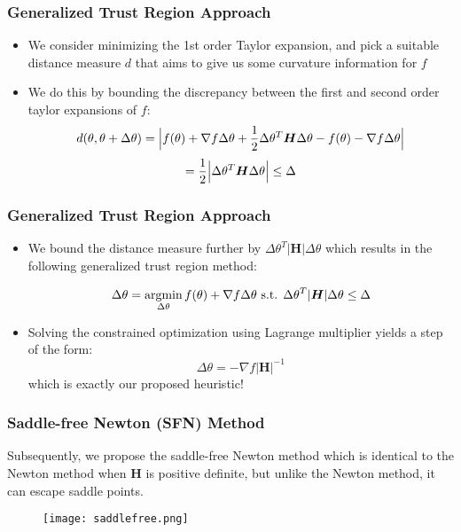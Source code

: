 \documentclass{beamer}
\begin{document}
\begin{frame}
\frametitle{Generalized Trust Region Approach}

\vspace{-0.1in}

\begin{itemize}
\item{We consider minimizing the 1st order Taylor expansion, and pick a suitable distance measure $d$ that aims to give us some curvature information for $f$}
\pause
\vspace{0.1in}

\item{We do this by bounding the discrepancy between the first and second order taylor expansions of $f$: $$ d(\theta, \theta + \Delta \theta) = \Bigl| f(\theta) + \nabla f \Delta\theta + \frac{1}{2}\Delta\theta^{T}\bm{H}\Delta\theta - f(\theta) - \nabla f \Delta\theta \Bigr|$$
$$ = \frac{1}{2} \Bigl | \Delta\theta^T \bm{H} \Delta\theta \Bigr | \leq \Delta $$}

\end{itemize}
\end{frame}



\begin{frame}
\frametitle{Generalized Trust Region Approach}

\begin{itemize}
\item{We bound the distance measure further by $\Delta\theta^{T} |\bm{H}| \Delta\theta$ which results in the following generalized trust region method:

$$ \Delta\theta = \mathop{\mathrm{argmin}}_{\Delta\theta} f(\theta) + \nabla f \Delta\theta \text{ s.t. } \Delta\theta^{T} |\bm{H}| \Delta\theta \leq \Delta $$}
\pause
\item{Solving the constrained optimization using Lagrange multiplier yields a step of the form: $$\Delta\theta = - \nabla f |\bm{H}|^{-1}$$ which is exactly our proposed heuristic!}
\end{itemize}

\end{frame}



\begin{frame}
\frametitle{Saddle-free Newton (SFN) Method}
\vspace{0.07in}
Subsequently, we propose the saddle-free Newton method which is identical to the Newton method when $\bm{H}$ is positive definite, but unlike the Newton method, it can escape saddle points.
\begin{figure}
\texttt{[image: saddlefree.png]}
\end{figure}
\end{frame}
\end{document}
